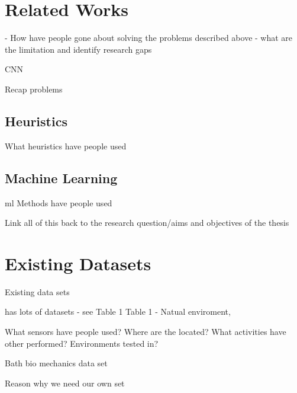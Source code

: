 \section{Related Works} - %
How have people gone about solving the problems described above - what are the limitation and identify research gaps

CNN \cite{Martinez-Hernandez2021}

Recap problems


\subsection{Heuristics}
What heuristics have people used

\subsection{Machine Learning} %
\acrshort{ml} Methods have people used


Link all of this back to the research question/aims and objectives of the thesis


\section{Existing Datasets} %
Existing data sets

\cite{Cruciani2020} has lots of datasets - see Table 1
\cite{Micucci2017} Table 1
\cite{Vaizman2017} - Natual enviroment,

\cite{Fu2021}

What sensors have people used? Where are the located? What activities have other performed? Environments tested in?

Bath bio mechanics data set

Reason why we need our own set

